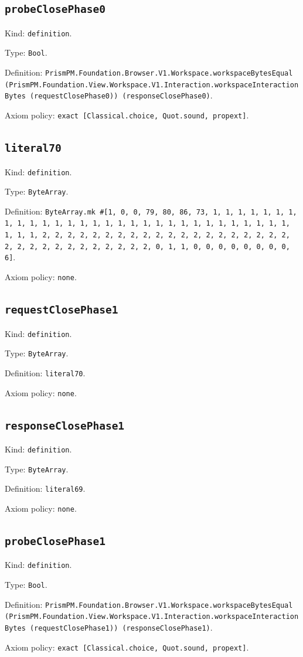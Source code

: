 \documentclass[11pt]{article}
\begin{document}
\subsection*{\texttt{probeClosePhase0}}
\noindent Kind: \texttt{definition}.\par
\noindent Type: \texttt{Bool}.\par
\noindent Definition: \texttt{PrismPM.Foundation.Browser.V1.Workspace.workspaceBytesEqual (PrismPM.Foundation.View.Workspace.V1.Interaction.workspaceInteractionBytes (requestClosePhase0)) (responseClosePhase0)}.\par
\noindent Axiom policy: \texttt{exact [Classical.choice, Quot.sound, propext]}.\par
\subsection*{\texttt{literal70}}
\noindent Kind: \texttt{definition}.\par
\noindent Type: \texttt{ByteArray}.\par
\noindent Definition: \texttt{ByteArray.mk \#[1, 0, 0, 79, 80, 86, 73, 1, 1, 1, 1, 1, 1, 1, 1, 1, 1, 1, 1, 1, 1, 1, 1, 1, 1, 1, 1, 1, 1, 1, 1, 1, 1, 1, 1, 1, 1, 1, 1, 1, 2, 2, 2, 2, 2, 2, 2, 2, 2, 2, 2, 2, 2, 2, 2, 2, 2, 2, 2, 2, 2, 2, 2, 2, 2, 2, 2, 2, 2, 2, 2, 2, 0, 1, 1, 0, 0, 0, 0, 0, 0, 0, 0, 6]}.\par
\noindent Axiom policy: \texttt{none}.\par
\subsection*{\texttt{requestClosePhase1}}
\noindent Kind: \texttt{definition}.\par
\noindent Type: \texttt{ByteArray}.\par
\noindent Definition: \texttt{literal70}.\par
\noindent Axiom policy: \texttt{none}.\par
\subsection*{\texttt{responseClosePhase1}}
\noindent Kind: \texttt{definition}.\par
\noindent Type: \texttt{ByteArray}.\par
\noindent Definition: \texttt{literal69}.\par
\noindent Axiom policy: \texttt{none}.\par
\subsection*{\texttt{probeClosePhase1}}
\noindent Kind: \texttt{definition}.\par
\noindent Type: \texttt{Bool}.\par
\noindent Definition: \texttt{PrismPM.Foundation.Browser.V1.Workspace.workspaceBytesEqual (PrismPM.Foundation.View.Workspace.V1.Interaction.workspaceInteractionBytes (requestClosePhase1)) (responseClosePhase1)}.\par
\noindent Axiom policy: \texttt{exact [Classical.choice, Quot.sound, propext]}.\par
\end{document}
